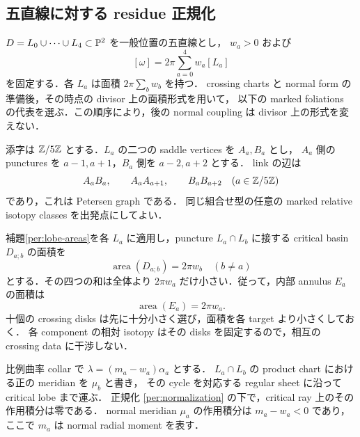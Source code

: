 \subsection{五直線に対する residue 正規化}

$D=L_0\cup\cdots\cup L_4\subset\mathbb P^2$ を一般位置の五直線とし，
$w_a>0$ および
\begin{equation}\label{per:positive-weights}
 [\omega]=2\pi\sum_{a=0}^4w_a[L_a]
\end{equation}
を固定する．各 $L_a$ は面積 $2\pi\sum_bw_b$ を持つ．
crossing charts と normal form の準備後，その時点の divisor 上の面積形式を用いて，
以下の marked foliations の代表を選ぶ．この順序により，後の normal coupling は divisor 上の形式を変えない．

添字は $\mathbb Z/5\mathbb Z$ とする．$L_a$ の二つの saddle vertices を $A_a,B_a$ とし，
$A_a$ 側の punctures を $a-1,a+1$，$B_a$ 側を $a-2,a+2$ とする．
link の辺は
\[
 A_aB_a,\qquad A_aA_{a+1},\qquad B_aB_{a+2}\quad(a\in\mathbb Z/5\mathbb Z)
\]
であり，これは Petersen graph である．
同じ組合せ型の任意の marked relative isotopy classes を出発点にしてよい．

補題\ref{per:lobe-areas}を各 $L_a$ に適用し，puncture $L_a\cap L_b$ に接する
critical basin $D_{a;b}$ の面積を
\begin{equation}\label{per:normalization}
 \operatorname{area}(D_{a;b})=2\pi w_b\quad(b\ne a)
\end{equation}
とする．その四つの和は全体より $2\pi w_a$ だけ小さい．従って，内部 annulus $E_a$ の面積は
\begin{equation}\label{per:annulus-one}
 \operatorname{area}(E_a)=2\pi w_a.
\end{equation}
十個の crossing disks は先に十分小さく選び，面積を各 target より小さくしておく．
各 component の相対 isotopy はその disks を固定するので，相互の crossing data に干渉しない．

\begin{lemma}
\label{per:zero-periods}
比例曲率 collar で $\lambda=(m_a-w_a)\alpha_a$ とする．
$L_a\cap L_b$ の product chart における正の meridian を $\mu_b$ と書き，
その cycle を対応する regular sheet に沿って critical lobe まで運ぶ．
正規化 \eqref{per:normalization} の下で，critical ray 上のその作用積分は零である．
normal meridian $\mu_a$ の作用積分は $m_a-w_a<0$ であり，
ここで $m_a$ は normal radial moment を表す．
\end{lemma}

